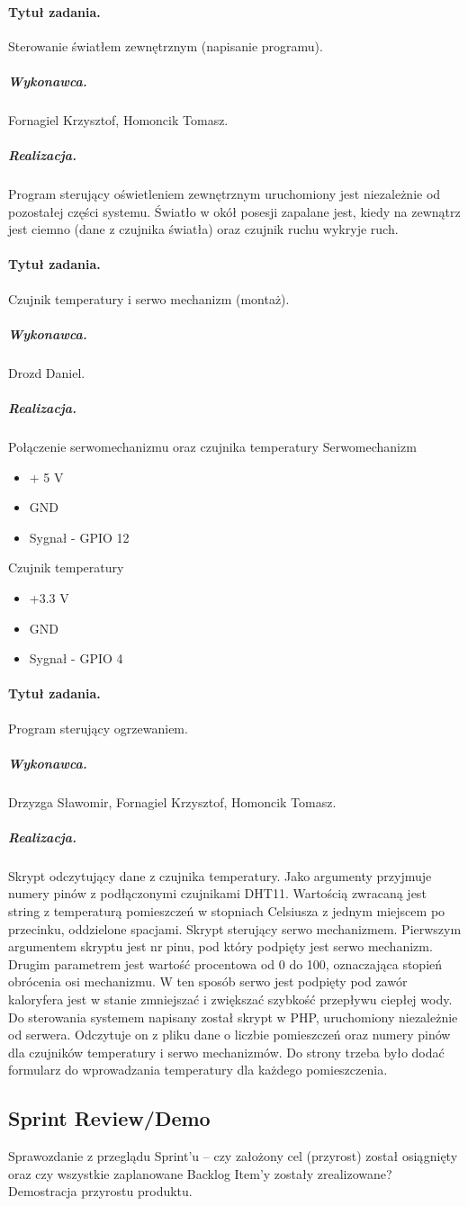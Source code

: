\paragraph{Tytuł zadania.} Sterowanie światłem zewnętrznym (napisanie programu).
\subparagraph{Wykonawca.} Fornagiel Krzysztof, Homoncik Tomasz.
\subparagraph{Realizacja.} Program sterujący oświetleniem zewnętrznym uruchomiony jest niezależnie od pozostałej części systemu. Światło w okół posesji zapalane jest, kiedy na zewnątrz jest ciemno (dane z czujnika światła) oraz czujnik ruchu wykryje ruch.

\paragraph{Tytuł zadania.} Czujnik temperatury i serwo mechanizm (montaż).
\subparagraph{Wykonawca.} Drozd Daniel.
\subparagraph{Realizacja.} Połączenie serwomechanizmu oraz czujnika temperatury
Serwomechanizm

\begin{itemize}
	\item + 5 V
	\item GND
	\item Sygnał - GPIO 12
\end{itemize}
Czujnik temperatury
\begin{itemize}
	\item +3.3 V
	\item GND
	\item Sygnał - GPIO 4
\end{itemize}


\paragraph{Tytuł zadania.} Program sterujący ogrzewaniem.
\subparagraph{Wykonawca.} Drzyzga Sławomir, Fornagiel Krzysztof, Homoncik Tomasz.
\subparagraph{Realizacja.} Skrypt odczytujący dane z czujnika temperatury. Jako argumenty przyjmuje numery pinów z podłączonymi czujnikami DHT11. Wartością zwracaną jest string z temperaturą pomieszczeń w stopniach Celsiusza z jednym miejscem po przecinku, oddzielone spacjami. 
\break
Skrypt sterujący serwo mechanizmem. Pierwszym argumentem skryptu jest nr pinu, pod który podpięty jest serwo mechanizm. Drugim parametrem jest wartość procentowa od 0 do 100, oznaczająca stopień obrócenia osi mechanizmu. W ten sposób serwo jest podpięty pod zawór kaloryfera jest w stanie zmniejszać i zwiększać szybkość przepływu ciepłej wody.
\break
Do sterowania systemem napisany został skrypt w PHP, uruchomiony niezależnie od serwera. Odczytuje on z pliku dane o liczbie pomieszczeń oraz numery pinów dla czujników temperatury i serwo mechanizmów.
Do strony trzeba było dodać formularz do wprowadzania temperatury dla każdego pomieszczenia.



\subsection{Sprint Review/Demo}
Sprawozdanie z przeglądu Sprint'u -- czy założony cel (przyrost) został osiągnięty oraz czy wszystkie zaplanowane Backlog Item'y zostały zrealizowane? Demostracja przyrostu produktu.
